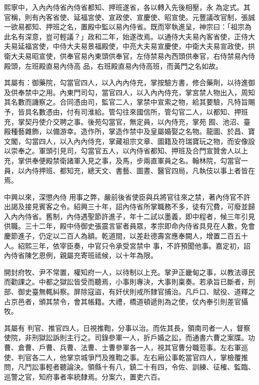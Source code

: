 \begin{pinyinscope}
 熙寧中，入內內侍省內侍省都知、押班遂省，各以轉入先後相壓，永
 為定式。其官稱，則有內客省使、延福宮使、宣政使、宣慶使、昭宣使。元豐議改官制，張誠一欲易都知、押班之名，置殿中監以易內侍省。既而宰執進呈，神宗曰：「祖宗為此名有深意，豈可輕議？」政和二年，始遂改焉。以通侍大夫易內客省使，正侍大夫易延福宮使，中侍大夫易景福殿使，中亮大夫易宣慶使，中衛大夫易宣政使，拱衛大夫易昭宣使，供奉官易內東頭供奉官，左侍禁易內西頭供奉官，右侍禁易內侍殿頭，左班殿直易內侍高
 品，右班殿直易內侍高班，而黃門之名如故。



 其屬有：御藥院，勾當官四人，以入內內侍充，掌按驗方書，修合藥劑，以待進御及供奉禁中之用。內東門司勾，當官四人，以入內內侍充，掌宮禁人物出入，周知其名數而譏察之。合同憑由司，監官二人，掌禁中宣索之物，給其要驗，凡特旨賜予，皆具名數憑由，付有司淮給。管勾往來國信所，管勾官二人，以都知、押班充，掌契丹使介交聘之事。後苑勾當官，無定員，以內侍充，掌苑
 囿、池沼、臺殿種藝雜飾，以備游幸。造作所，掌造作禁中及皇屬婚娶之名物。龍圖、於昌、寶文閣，勾當四人，以入內內侍充，掌藏祖宗文章、圖籍及符瑞寶玩之物，而安像設以崇奉之。軍頭引見司，勾當官五人，以內侍省都知、押班及合門宣贊舍人以上充，掌供奉便殿禁衛諸軍入見之事，及馬，步兩直軍員之名。翰林院，勾當官一員，以內侍押班、都知充，總天文、書藝、圖晝、醫官四局，凡執伎以事上者皆在焉。



 中興以來，深懲內侍
 用事之弊，嚴前後省使臣與兵將官往來之禁，著內侍官不許出謁及接見賓客之令。紹興三十年，詔內侍省所掌職務不多，徒有冗費，可廢並歸入內內侍省。舊制，內侍遇聖節許進子，年十二試以墨義，即中程者，候三年引見供職。三十二年，殿中侍御史張震言宦者員眾，孝宗即命內侍省具見在人數，免會慶節進子，仍定以二百人為額。乾道間，以差赴德壽宮應奉闕人，增置二百五十人。紹熙三年，依宰臣奏，中官只令承受宮禁中
 事，不許預聞他事。嘉定初，詔內侍省陳乞恩例，親屬充寄班祗候，以十年為限。



 開封府牧、尹不常置，權知府一人，以待制以上充。掌尹正畿甸之事，以教法導民而勸課之。中都之獄訟皆受而聽焉，小事則專決，大事則稟奏。若承旨已斷者，刑部、御史臺無輒糾察。屏除寇盜，有奸伏則戒所隸官捕治。凡戶口、賦役、道釋之占京邑者，頒其禁令，會其帳籍。大禮，橋道頓遞則為之使，仗內奉引則差官攝牧。



 其屬有
 判官、推官四人，日視推鞫，分事以治。而佐其長，領南司者一人，督察使院，非刑獄訟訴則主行之。司錄參軍一人，折戶婚之訟，而通書六曹之案牒。功曹、倉曹、戶曹、兵曹、法曹、士曹參軍各一人，視其官曹分職蒞事。左右軍巡使、判官各二人，他掌京城爭鬥及推鞫之事。左右廂公事乾當官四人，掌檢覆推問，凡鬥訟事輕者聽論決。領縣十有八，鎮二十有四，令佐、訓練、征榷、監臨、巡警之官，知府事者率統隸焉。分案六，置吏六百。




\end{pinyinscope}
